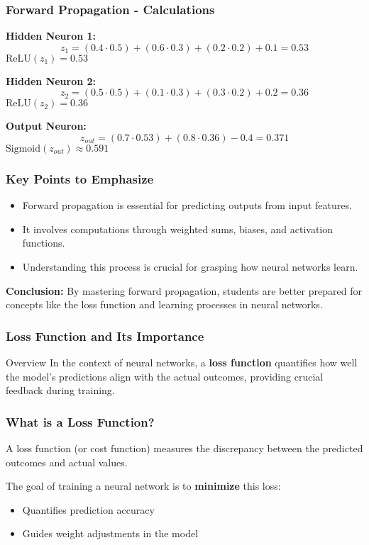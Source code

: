 \documentclass[aspectratio=169]{beamer}
\begin{document}
\begin{frame}[fragile]
    \frametitle{Forward Propagation - Calculations}
    \textbf{Hidden Neuron 1:}
    \begin{equation}
        z_1 = (0.4 \cdot 0.5) + (0.6 \cdot 0.3) + (0.2 \cdot 0.2) + 0.1 = 0.53
    \end{equation}
     $\text{ReLU}(z_1) = 0.53$

    \textbf{Hidden Neuron 2:}
    \begin{equation}
        z_2 = (0.5 \cdot 0.5) + (0.1 \cdot 0.3) + (0.3 \cdot 0.2) + 0.2 = 0.36
    \end{equation}
     $\text{ReLU}(z_2) = 0.36$

    \textbf{Output Neuron:}
    \begin{equation}
        z_{out} = (0.7 \cdot 0.53) + (0.8 \cdot 0.36) - 0.4 = 0.371
    \end{equation}
     $\text{Sigmoid}(z_{out}) \approx 0.591$
\end{frame}

\begin{frame}[fragile]
    \frametitle{Key Points to Emphasize}
    \begin{itemize}
        \item Forward propagation is essential for predicting outputs from input features.
        \item It involves computations through weighted sums, biases, and activation functions.
        \item Understanding this process is crucial for grasping how neural networks learn.
    \end{itemize}

    \textbf{Conclusion:} By mastering forward propagation, students are better prepared for concepts like the loss function and learning processes in neural networks.
\end{frame}

\begin{frame}[fragile]
    \frametitle{Loss Function and Its Importance}
    \begin{block}{Overview}
        In the context of neural networks, a \textbf{loss function} quantifies how well the model's predictions align with the actual outcomes, providing crucial feedback during training.
    \end{block}
\end{frame}

\begin{frame}[fragile]
    \frametitle{What is a Loss Function?}
    A loss function (or cost function) measures the discrepancy between the predicted outcomes and actual values.
    
    The goal of training a neural network is to \textbf{minimize} this loss:
    \begin{itemize}
        \item Quantifies prediction accuracy
        \item Guides weight adjustments in the model
    \end{itemize}
\end{frame}
\end{document}
